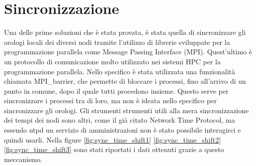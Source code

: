 \section{Sincronizzazione}\label{sec:timesync}
Una delle prime soluzioni che è stata provata, è stata quella di sincronizzare gli orologi locali dei diversi nodi tramite l'utilizzo di librerie sviluppate per la programmazione parallela come Message Passing Interface (MPI). Quest'ultimo è un protocollo di comunicazione molto utilizzato nei sistemi HPC per la programmazione parallela.
Nello specifico è stata utilizzata una funzionalità chiamata MPI\_barrier, che permette di bloccare i processi, fino all'arrivo di un punto in comune, dopo il quale tutti procedono insieme. Questo serve per sincronizzare i processi tra di loro, ma non è ideata nello specifico per sincronizzare gli orologi. Gli strumenti strumenti utili alla mera sincronizzazione dei tempi dei nodi sono altri, come il già citato Network Time Protocol,
ma essendo ntpd un servizio di amministrazioni non è stato possibile interagirci e quindi usarli. Nella figure \ref{fig:sync_time_shift1} \ref{fig:sync_time_shift2} \ref{fig:sync_time_shift3} sono stati riportati i dati ottenuti grazie a questo meccanismo.

